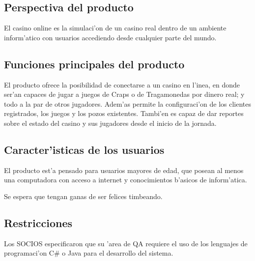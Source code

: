  \subsection{ Perspectiva del producto	}
El casino online es la simulaci'on de un casino real dentro de un ambiente inform'atico con usuarios accediendo desde cualquier parte del mundo.

 \subsection{ Funciones principales del producto }
El producto ofrece la posibilidad de conectarse a un casino en l'inea, en donde ser'an capaces de jugar a juegos de Craps o de Tragamonedas por dinero real; y todo a la par de otros jugadores. Adem'as permite la configuraci'on de los clientes registrados, los juegos y los pozos existentes. Tambi'en es capaz de dar reportes sobre el estado del casino y sus jugadores desde el inicio de la jornada.

 \subsection{ Caracter'isticas de los usuarios }
El producto est'a pensado para usuarios mayores de edad, que posean al menos una computadora con acceso a internet y conocimientos b'asicos de inform'atica.

Se espera que tengan ganas de ser felices timbeando.

 \subsection{ Restricciones }
Los SOCIOS especificaron que su 'area de QA requiere el uso de los lenguajes de programaci'on C\# o Java para el desarrollo del sistema.

